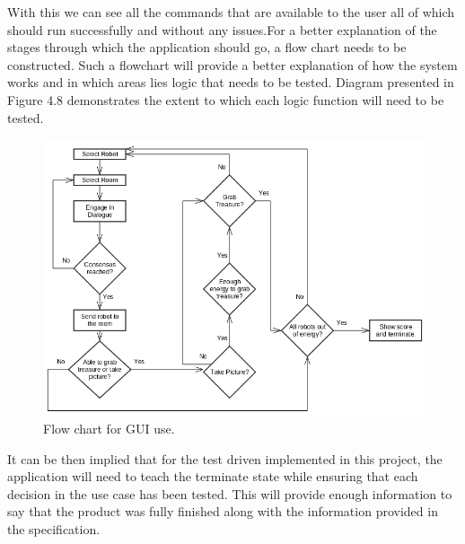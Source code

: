 \documentclass{report}
\begin{document}
      With this we can see all the commands that are available to the user all of which should run successfully and without any issues.For a better explanation of the stages through which the application should go, a flow chart needs to be constructed. Such a flowchart will provide a better explanation of how the system works and in which areas lies logic that needs to be tested. Diagram presented in Figure 4.8 demonstrates the extent to which each logic function will need to be tested.

        \begin{figure}[!ht]  
          \centering
            \includegraphics[width=1.1\textwidth]{figures/flowChart.png}
            \caption{Flow chart for GUI use.}
        \end{figure}

      It can be then implied that for the test driven implemented in this project, the application will need to teach the terminate state while ensuring that each decision in the use case has been tested. This will provide enough information to say that the product was fully finished along with the information provided in the specification.
\end{document}
